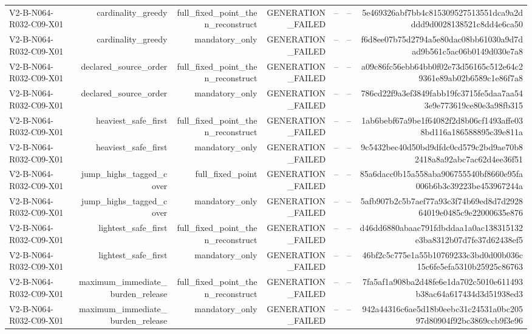 {\begin{longtable}{lrrrrrr}
V2-B-N064-R032-C09-X01 & cardinality\_greedy & full\_fixed\_point\_then\_reconstruct & GENERATION\_FAILED & -- & -- & 5e469326abf7bb4c815309527513551dca9a2dddd9d0028138521c8dd4e6ca50 \\
V2-B-N064-R032-C09-X01 & cardinality\_greedy & mandatory\_only & GENERATION\_FAILED & -- & -- & f6d8ee07b75d2794a5e80dac08bb61030a9d7dad9b561c5ac06b0149d030e7a8 \\
V2-B-N064-R032-C09-X01 & declared\_source\_order & full\_fixed\_point\_then\_reconstruct & GENERATION\_FAILED & -- & -- & a09c86fc56ebb64bb0f02e73d56165c512e64c29361e89ab02b6589c1e86f7a8 \\
V2-B-N064-R032-C09-X01 & declared\_source\_order & mandatory\_only & GENERATION\_FAILED & -- & -- & 786cd22f9a3ef3849fabb19fc3715fe5daa7aa543e9e773619ce80e3a98fb315 \\
V2-B-N064-R032-C09-X01 & heaviest\_safe\_first & full\_fixed\_point\_then\_reconstruct & GENERATION\_FAILED & -- & -- & 1ab6bebf67a9be1f64082f2d8b06cf1493affe038bd116a186588895c39e811a \\
V2-B-N064-R032-C09-X01 & heaviest\_safe\_first & mandatory\_only & GENERATION\_FAILED & -- & -- & 9c5432bec40d50bd9dfdc0cd579c2bd9ae70b82418a8a92abc7ac62d4ee36f51 \\
V2-B-N064-R032-C09-X01 & jump\_highs\_tagged\_cover & full\_fixed\_point & GENERATION\_FAILED & -- & -- & 85a6dacc0b15a558aba906755540bf8660e95fa006b6b3c39223be453967244a \\
V2-B-N064-R032-C09-X01 & jump\_highs\_tagged\_cover & mandatory\_only & GENERATION\_FAILED & -- & -- & 5afb907b2c5b7aef77a93c3f74b69ed8d7d292864019e0485c9e22000635e876 \\
V2-B-N064-R032-C09-X01 & lightest\_safe\_first & full\_fixed\_point\_then\_reconstruct & GENERATION\_FAILED & -- & -- & d46dd6880abaac791fdbddaa1a0ac138315132e3ba8312b07d7fe37d62438ef5 \\
V2-B-N064-R032-C09-X01 & lightest\_safe\_first & mandatory\_only & GENERATION\_FAILED & -- & -- & 46bf2c5c775e1a55b10769233c3bd0d00b036c15c6fe5efa5310b25925c86763 \\
V2-B-N064-R032-C09-X01 & maximum\_immediate\_burden\_release & full\_fixed\_point\_then\_reconstruct & GENERATION\_FAILED & -- & -- & 7fa5af1a908ba2d48fe6e1da702c5010e611493b38ac64a617434d3d51938ed3 \\
V2-B-N064-R032-C09-X01 & maximum\_immediate\_burden\_release & mandatory\_only & GENERATION\_FAILED & -- & -- & 942a44316c6ae5d18b0eebc31c24531a0bc20597d80904f92bc3869ccb9f3e96 \\

\end{longtable}}
